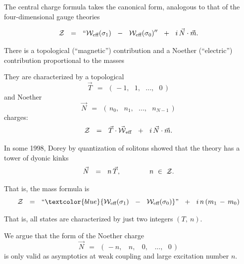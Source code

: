 \documentclass[12pt,letterpaper,landscape,KOMA,smallheadings,calcdimensions,display]{powersem}
\newcommand{\W}{\mathcal{W}}
\begin{document}
\begin{slide}

	The central charge formula takes the canonical form, analogous to that of the
	four-dimensional gauge theories

\[
	\mc{Z} ~~=~~ `` \W_\text{eff} ( \sigma_1 ) ~~-~~ \W_\text{eff} ( \sigma_0 ) '' ~~+~~  i\, \vec{N} \cdot \vec{m}\text{.}
\]

	There is a topological (``magnetic'') contribution and a Noether (``electric'') contribution proportional to the masses

	They are characterized by a topological
\[
	\vec{T} ~~=~~ (\, -1,~~~ 1,~~~ ...,~~~ 0\,)
\]
	and Noether 
\[
	\vec{N} ~~=~~ (\, n_0,~~~ n_1,~~~ ...,~~~ n_{N-1}\,)
\]
	charges:
\[
	\mc{Z} ~~=~~ \vec{T} \cdot \vec{\W}{}_\text{eff} ~~+~~ i\, \vec{N} \cdot \vec{m} \text.
\]

\end{slide}


\begin{slide}

	In some 1998, Dorey by quantization of solitons showed that the theory has
	a tower of dyonic kinks
\[
	\vec{N} ~~=~~ n\, \vec{T},\,   \qquad\qquad  n ~\in~ \mathcal{Z}\text.
\]

	That is, the mass formula is
\[
	\mc{Z} ~~=~~  \text{``} \textcolor{blue}{
\W_\text{eff} ( \sigma_1 ) ~~-~~ \W_\text{eff} ( \sigma_0 )} \text{''}  ~~+~~  i\,n\, (m_1 \,-\, m_0)
\]

	That is, all states are characterized by just two integers $ (T,~ n) $.

	We argue that the form of the Noether charge
\[
	\vec{N} ~~=~~ (\, -n,~~~~ n,~~~~ 0,~~~~...,~~~0 \,)
\]
	is only valid as asymptotics at weak coupling and large excitation number $ n $.

\end{slide}
\end{document}
